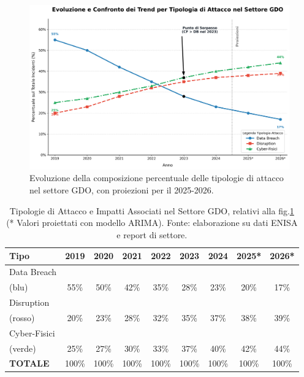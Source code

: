 \begin{figure}[htbp]
    \centering
    \includegraphics[width=\textwidth]{thesis_figures/cap1/evoluzione_attacchi.png}
    \caption{Evoluzione della composizione percentuale delle tipologie di attacco nel settore GDO, con proiezioni per il 2025-2026.}
    \label{fig:evoluzione_attacchi}
\end{figure}
\begin{table}[htbp]

\centering
 \small
 \sffamily 
\begin{tabularx}{\textwidth}{l cccccccc}
\toprule
\textbf{Tipo} & \textbf{2019} & \textbf{2020} & \textbf{2021} & \textbf{2022} & \textbf{2023} & \textbf{2024} & \textbf{2025*} & \textbf{2026*}\\
\midrule
Data Breach\\ (blu) & 55\% & 50\% & 42\% & 35\% & 28\% & 23\% & 20\% & 17\% \\
Disruption\\ (rosso) & 20\% & 23\% & 28\% & 32\% & 35\% & 37\% & 38\% & 39\% \\
Cyber-Fisici\\ (verde) & 25\% & 27\% & 30\% & 33\% & 37\% & 40\% & 42\% & 44\% \\
\midrule
\textbf{TOTALE} & 100\% & 100\% & 100\% & 100\% & 100\% & 100\% & 100\% & 100\% \\
\bottomrule
\end{tabularx}
\caption{Tipologie di Attacco e Impatti Associati nel Settore GDO, relativi alla fig.\ref{fig:evoluzione_attacchi} (* Valori proiettati con modello ARIMA). Fonte: elaborazione su dati ENISA e report di settore.}
\label{tab:threat_evolution}
\end{table}

